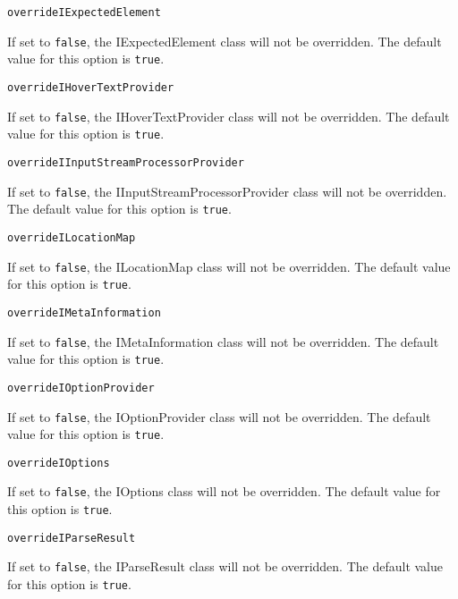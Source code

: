 \noindent\texttt{overrideIExpectedElement}
\begin{myindentpar}{1cm}
If set to \texttt{false}, the IExpectedElement class will not be overridden. The default value for this option is \texttt{true}.
\end{myindentpar}

\noindent\texttt{overrideIHoverTextProvider}
\begin{myindentpar}{1cm}
If set to \texttt{false}, the IHoverTextProvider class will not be overridden. The default value for this option is \texttt{true}.
\end{myindentpar}

\noindent\texttt{overrideIInputStreamProcessorProvider}
\begin{myindentpar}{1cm}
If set to \texttt{false}, the IInputStreamProcessorProvider class will not be overridden. The default value for this option is \texttt{true}.
\end{myindentpar}

\noindent\texttt{overrideILocationMap}
\begin{myindentpar}{1cm}
If set to \texttt{false}, the ILocationMap class will not be overridden. The default value for this option is \texttt{true}.
\end{myindentpar}

\noindent\texttt{overrideIMetaInformation}
\begin{myindentpar}{1cm}
If set to \texttt{false}, the IMetaInformation class will not be overridden. The default value for this option is \texttt{true}.
\end{myindentpar}

\noindent\texttt{overrideIOptionProvider}
\begin{myindentpar}{1cm}
If set to \texttt{false}, the IOptionProvider class will not be overridden. The default value for this option is \texttt{true}.
\end{myindentpar}

\noindent\texttt{overrideIOptions}
\begin{myindentpar}{1cm}
If set to \texttt{false}, the IOptions class will not be overridden. The default value for this option is \texttt{true}.
\end{myindentpar}

\noindent\texttt{overrideIParseResult}
\begin{myindentpar}{1cm}
If set to \texttt{false}, the IParseResult class will not be overridden. The default value for this option is \texttt{true}.
\end{myindentpar}

